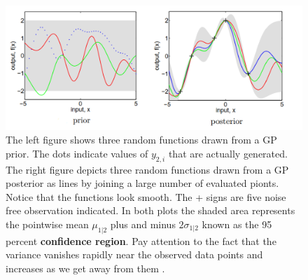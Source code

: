 \documentclass[10pt]{article}
\theoremstyle{definition}
\begin{document}
\begin{figure}[t!]
\centering
\includegraphics[width=12cm]{figs/prior-posterior.png}
\caption{The left figure shows three random functions drawn from a GP prior. The dots indicate values of $y_{2,i}$ that are actually generated. The right figure depicts three random functions drawn from a GP posterior as lines by joining a large number of evaluated pionts. Notice that the functions look smooth. The + signs are five noise free observation indicated. In both plots the shaded area represents the pointwise mean $\mu_{1|2}$ plus and minus $2\sigma_{1|2}$ known as the 95 percent \textbf{confidence region}. Pay attention to the fact that the variance vanishes rapidly near the observed data points and increases as we get away from them \cite{Rasmussen2006}.}
\label{fig:prior:posterior}
\end{figure}
\end{document}
